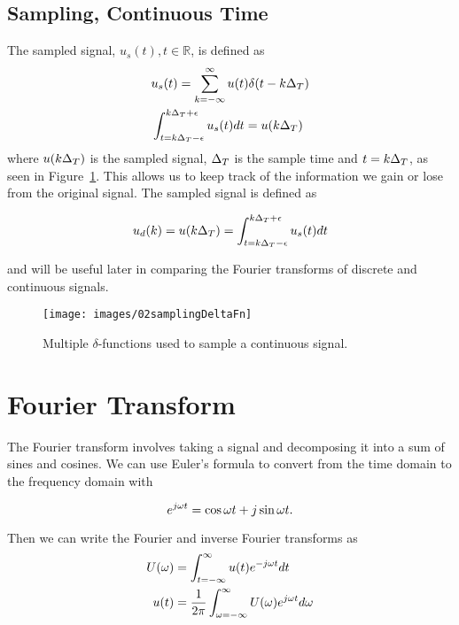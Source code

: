 \subsection{Sampling, Continuous Time}
The sampled signal, $u_s(t), t \in \mathbb{R}$, is defined as
\begin{align*}
&u_s(t) = \sum_{k=-\infty}^\infty u(t)\delta(t-k\Delta_T) \\
&\int_{t=k\Delta_T-\epsilon}^{k\Delta_T+\epsilon} u_s(t)dt = u(k\Delta_T)
\end{align*}
where $u(k\Delta_T)$ is the sampled signal, $\Delta_T$ is the sample time and $t=k\Delta_T$, as seen in Figure~\ref{fig:02samplingDeltaFn}.
This allows us to keep track of the information we gain or lose from the original signal.
The sampled signal is defined as

\begin{equation*}
u_d(k) = u(k\Delta_T) = \int_{t=k\Delta_T-\epsilon}^{k\Delta_T+\epsilon} u_s(t)dt
\end{equation*}

and will be useful later in comparing the Fourier transforms of discrete and continuous signals.
\begin{figure}[ht!]
\centering
\texttt{[image: images/02samplingDeltaFn]}
\caption{Multiple $\delta$-functions used to sample a continuous signal.}%
\label{fig:02samplingDeltaFn}
\end{figure}

\section{Fourier Transform}
The Fourier transform involves taking a signal and decomposing it into a sum of sines and cosines.
We can use Euler's formula to convert from the time domain to the frequency domain with

\begin{equation*}
e^{j\omega t} = \cos\omega t + j\sin\omega t.
\end{equation*}

Then we can write the Fourier and inverse Fourier transforms as
\begin{align*}
U(\omega) &= \int_{t=-\infty}^\infty u(t)e^{-j\omega t}dt \\
u(t) &= \frac{1}{2\pi} \int_{\omega=-\infty}^\infty U(\omega)e^{j\omega t}d\omega
\end{align*}

